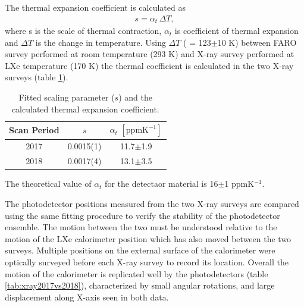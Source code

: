 The thermal expansion coefficient is calculated as
\begin{align}
 s= \alpha_t \, \Delta T,
\end{align}
where s is the scale of thermal contraction, $\alpha_t$ is coefficient
of thermal expansion and $\Delta T$ is the change in temperature. 
Using $\Delta T$ ( = 123$\pm$10 K) 
between FARO survey performed at room temperature
(293 K) and X-ray survey performed at LXe temperature (170 K)
the thermal coefficient is calculated in the
two X-ray surveys (table \ref{tab:thermalcoefficient}).
\begin{table}[h]
\begin{tabular}{ccc}
Scan Period & $s$ & $\alpha_t \,\, [\mathrm{ppm K}^{-1}]$\\
\hline
2017 & 0.0015(1) & 11.7$\pm$1.9 \\
2018 & 0.0017(4) & 13.1$\pm$3.5 
\end{tabular}
\caption{Fitted scaling parameter ($s$) and the calculated thermal 
expansion coefficient.}
\label{tab:thermalcoefficient}
\end{table}
The theoretical value of $\alpha_t$ for the
detectaor material is 16$\pm$1 ppmK$^{-1}$.

The photodetector positions measured from the two X-ray surveys are
compared using the same fitting procedure to verify the stability 
of the photodetector ensemble.
The motion between the two
must be understood relative to the motion of the LXe calorimeter
position which has also moved between the two surveys.  Multiple
positions on the external surface of the calorimeter were optically
surveyed before each X-ray survey to record its location.  
Overall the motion of the calorimeter is replicated well 
by the photodetectors (table \ref{tab:xray2017vs2018}),
characterized by small angular rotations, and 
large displacement along X-axis seen in both data. 

